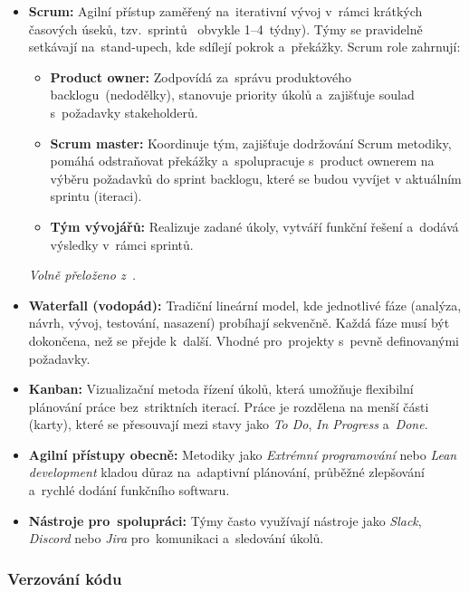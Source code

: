 \documentclass[male,czech,api_bc]{kitheses}
\begin{document}
\begin{itemize}
	\item \textbf{Scrum:} Agilní přístup zaměřený na~iterativní vývoj v~rámci krátkých časových úseků, tzv.~sprintů ~obvykle 1--4~týdny). Týmy se pravidelně setkávají na~stand-upech, kde sdílejí pokrok a~překážky. Scrum role zahrnují:
	\begin{itemize}
		\item \textbf{Product owner:} Zodpovídá za~správu produktového backlogu~(nedodělky), stanovuje priority úkolů a~zajišťuje soulad s~požadavky stakeholderů.
		\item \textbf{Scrum master:} Koordinuje tým, zajišťuje dodržování Scrum metodiky, pomáhá odstraňovat překážky a~spolupracuje s~product ownerem na výběru požadavků do sprint backlogu, které se budou vyvíjet v aktuálním sprintu (iteraci).
		\item \textbf{Tým vývojářů:} Realizuje zadané úkoly, vytváří funkční řešení a~dodává výsledky v~rámci sprintů.
	\end{itemize}
	\noindent
	\textit{Volně přeloženo z~\cite{scrum}.}
	
	\item \textbf{Waterfall (vodopád):} Tradiční lineární model, kde jednotlivé fáze (analýza, návrh, vývoj, testování, nasazení) probíhají sekvenčně. Každá fáze musí být dokončena, než se přejde k~další. Vhodné pro~projekty s~pevně definovanými požadavky.
	
	\item \textbf{Kanban:} Vizualizační metoda řízení úkolů, která umožňuje flexibilní plánování práce bez~striktních iterací. Práce je rozdělena na menší části (karty), které se přesouvají mezi stavy jako \textit{To Do}, \textit{In Progress} a~\textit{Done}.
	
	\item \textbf{Agilní přístupy obecně:} Metodiky jako \textit{Extrémní programování} nebo \textit{Lean development} kladou důraz na~adaptivní plánování, průběžné zlepšování a~rychlé dodání funkčního softwaru.
	
	\item \textbf{Nástroje pro~spolupráci:} Týmy často využívají nástroje jako \textit{Slack}, \textit{Discord} nebo \textit{Jira} pro~komunikaci a~sledování úkolů.
\end{itemize}

\subsubsection{Verzování kódu}
\end{document}
